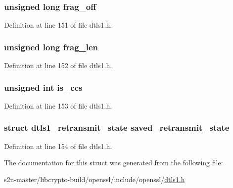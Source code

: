 \subsubsection[{\texorpdfstring{frag\+\_\+off}{frag_off}}]{\setlength{\rightskip}{0pt plus 5cm}unsigned long frag\+\_\+off}\hypertarget{structhm__header__st_add4d70beaa661815ac32ade43f854cb8}{}\label{structhm__header__st_add4d70beaa661815ac32ade43f854cb8}


Definition at line 151 of file dtls1.\+h.

\subsubsection[{\texorpdfstring{frag\+\_\+len}{frag_len}}]{\setlength{\rightskip}{0pt plus 5cm}unsigned long frag\+\_\+len}\hypertarget{structhm__header__st_ad00a64dfd79008ae0f22a6852b51e36c}{}\label{structhm__header__st_ad00a64dfd79008ae0f22a6852b51e36c}


Definition at line 152 of file dtls1.\+h.

\subsubsection[{\texorpdfstring{is\+\_\+ccs}{is_ccs}}]{\setlength{\rightskip}{0pt plus 5cm}unsigned int is\+\_\+ccs}\hypertarget{structhm__header__st_abc49dd4194c1935979c69d485e00a9b0}{}\label{structhm__header__st_abc49dd4194c1935979c69d485e00a9b0}


Definition at line 153 of file dtls1.\+h.

\subsubsection[{\texorpdfstring{saved\+\_\+retransmit\+\_\+state}{saved_retransmit_state}}]{\setlength{\rightskip}{0pt plus 5cm}struct {\bf dtls1\+\_\+retransmit\+\_\+state} saved\+\_\+retransmit\+\_\+state}\hypertarget{structhm__header__st_aec504639074429d1208ba5f0a72904c4}{}\label{structhm__header__st_aec504639074429d1208ba5f0a72904c4}


Definition at line 154 of file dtls1.\+h.



The documentation for this struct was generated from the following file\+:\begin{DoxyCompactItemize}
\item 
s2n-\/master/libcrypto-\/build/openssl/include/openssl/\hyperlink{include_2openssl_2dtls1_8h}{dtls1.\+h}\end{DoxyCompactItemize}
